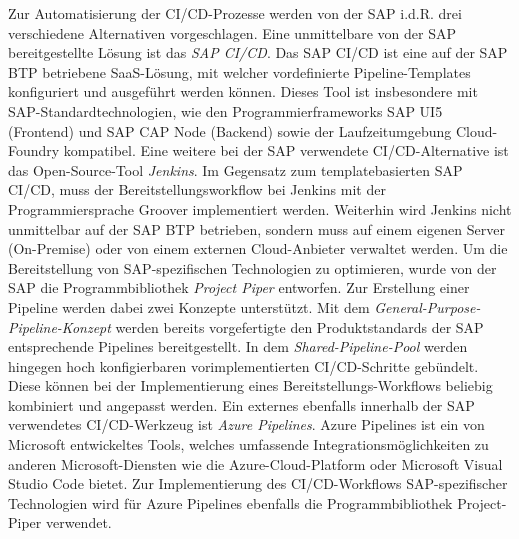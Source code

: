 Zur Automatisierung der CI/CD-Prozesse werden von der SAP i.d.R. drei verschiedene Alternativen vorgeschlagen. Eine unmittelbare von der SAP bereitgestellte Lösung ist das \textit{\ac{SAP CI/CD}}. Das SAP CI/CD ist eine auf der SAP BTP betriebene SaaS-Lösung, mit welcher vordefinierte Pipeline-Templates konfiguriert und ausgeführt werden können. Dieses Tool ist insbesondere mit SAP-Standardtechnologien, wie den Programmierframeworks SAP UI5 (Frontend) und SAP CAP Node (Backend) sowie der Laufzeitumgebung Cloud-Foundry kompatibel. Eine weitere bei der SAP verwendete CI/CD-Alternative ist das Open-Source-Tool \textit{Jenkins}. Im Gegensatz zum templatebasierten SAP CI/CD, muss der Bereitstellungsworkflow bei Jenkins mit der Programmiersprache Groover implementiert werden. Weiterhin wird Jenkins nicht unmittelbar auf der SAP BTP betrieben, sondern muss auf einem eigenen Server (On-Premise) oder von einem externen Cloud-Anbieter verwaltet werden. Um die Bereitstellung von SAP-spezifischen Technologien zu optimieren, wurde von der SAP die Programmbibliothek \textit{Project Piper} entworfen. Zur Erstellung einer Pipeline werden dabei zwei Konzepte unterstützt. Mit dem \textit{General-Purpose-Pipeline-Konzept} werden bereits vorgefertigte den Produktstandards der SAP entsprechende Pipelines bereitgestellt. In dem \textit{Shared-Pipeline-Pool} werden hingegen hoch konfigierbaren vorimplementierten CI/CD-Schritte gebündelt. Diese können bei der Implementierung eines Bereitstellungs-Workflows beliebig kombiniert und angepasst werden.
Ein externes ebenfalls innerhalb der SAP verwendetes CI/CD-Werkzeug ist \textit{Azure Pipelines}. Azure Pipelines ist ein von Microsoft entwickeltes Tools, welches umfassende Integrationsmöglichkeiten zu anderen Microsoft-Diensten wie die Azure-Cloud-Platform oder Microsoft Visual Studio Code bietet. Zur Implementierung des CI/CD-Workflows SAP-spezifischer Technologien wird für Azure Pipelines ebenfalls die Programmbibliothek Project-Piper verwendet.

